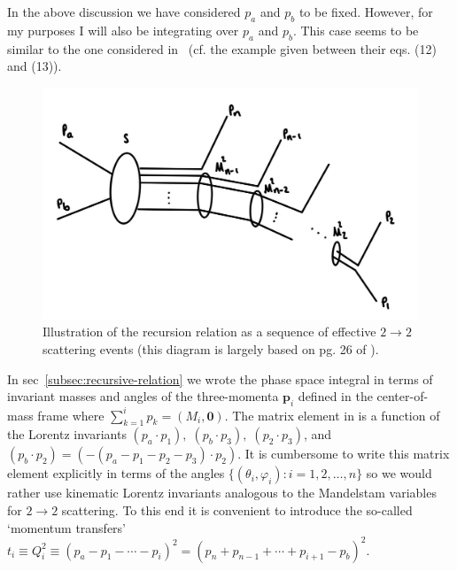 In the above discussion we have considered $p_a$ and $p_b$ to be fixed.
However, for my purposes I will also be integrating over $p_a$ and $p_b$.
This case seems to be similar to the one considered in~\cite{Isaacson:2021xty} (cf. the example given between their eqs. (12) and (13)).


\begin{figure}[t]
    \centering
    \includegraphics[width=0.6\linewidth]{figs/recursion-diagram.jpg}
    \caption{Illustration of the recursion relation as a sequence of effective $2 \rightarrow 2$ scattering events (this diagram is largely based on pg. 26 of \cite{James:1968gu}).}
    \label{fig:recursion-diagram}
\end{figure}

\label{subsec:momentum-transfers}

In sec~\ref{subsec:recursive-relation} we wrote the phase space integral in terms of invariant masses and angles of the three-momenta $\bm{p}_i$ defined in the center-of-mass frame where $\sum_{k=1}^{i} p_k = (M_{i}, \bm{0})$. 
The matrix element in  is a function of the Lorentz invariants $(p_a \cdot p_1), \; (p_b \cdot p_3), \; (p_2 \cdot p_3)$, and $(p_b \cdot p_2) = (- (p_a - p_1 - p_2 - p_3) \cdot p_2)$. 
It is cumbersome to write this matrix element explicitly in terms of the angles $\{ (\theta_i, \varphi_i) : i = 1, 2, \ldots, n\}$ so we would rather use kinematic Lorentz invariants analogous to the Mandelstam variables for $2 \rightarrow 2$ scattering\footnotemark.
To this end it is convenient to introduce the so-called `momentum transfers' $t_i \equiv Q_i^2 \equiv (p_a - p_1 - \cdots - p_i)^2 = (p_n + p_{n-1} + \cdots + p_{i + 1} - p_b)^2$.


